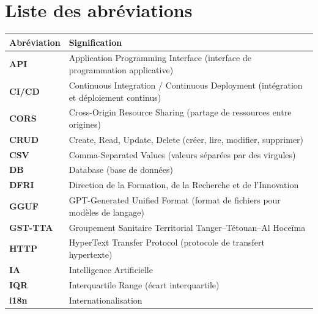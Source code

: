 \chapter*{Liste des abréviations}



\small
\renewcommand{\arraystretch}{0.88}

\begin{tabularx}{\textwidth}{>{\bfseries}p{3.0cm}X}
\toprule
\rowcolor{TableHeader}
\color{white}Abréviation & \color{white}Signification \\
\midrule

API & Application Programming Interface (interface de programmation applicative) \\

CI/CD & Continuous Integration / Continuous Deployment (intégration et déploiement continus) \\

CORS & Cross-Origin Resource Sharing (partage de ressources entre origines) \\


CRUD & Create, Read, Update, Delete (créer, lire, modifier, supprimer) \\

CSV & Comma-Separated Values (valeurs séparées par des virgules) \\

DB & Database (base de données) \\

DFRI & Direction de la Formation, de la Recherche et de l'Innovation \\


GGUF & GPT-Generated Unified Format (format de fichiers pour modèles de langage) \\

GST-TTA & Groupement Sanitaire Territorial Tanger--Tétouan--Al Hoceïma \\

HTTP & HyperText Transfer Protocol (protocole de transfert hypertexte) \\

IA & Intelligence Artificielle \\

IQR & Interquartile Range (écart interquartile) \\

i18n & Internationalisation \\


\end{tabularx}
